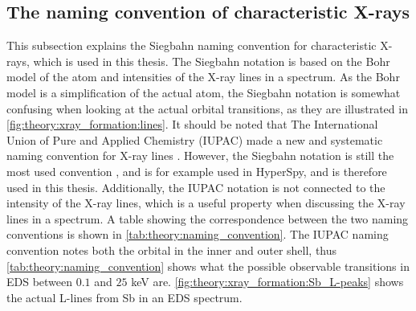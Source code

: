 \subsection{The naming convention of characteristic X-rays}
\label{theory:xray_formation:naming}

This subsection explains the Siegbahn naming convention for characteristic X-rays, which is used in this thesis.
The Siegbahn notation is based on the Bohr model of the atom and intensities of the X-ray lines in a spectrum.
As the Bohr model is a simplification of the actual atom, the Siegbahn notation is somewhat confusing when looking at the actual orbital transitions, as they are illustrated in \cref{fig:theory:xray_formation:lines}.
It should be noted that The International Union of Pure and Applied Chemistry (IUPAC) made a new and systematic naming convention for X-ray lines \cite{IUPAC_nomenclature1991}.
However, the Siegbahn notation is still the most used convention \cite[Ch. 4.2.4]{goldstein_scanning_2018}, and is for example used in HyperSpy, and is therefore used in this thesis.
Additionally, the IUPAC notation is not connected to the intensity of the X-ray lines, which is a useful property when discussing the X-ray lines in a spectrum.
A table showing the correspondence between the two naming conventions is shown in \cref{tab:theory:naming_convention}.
The IUPAC naming convention notes both the orbital in the inner and outer shell, thus \cref{tab:theory:naming_convention} shows what the possible observable transitions in EDS between $0.1$ and $25$ keV are.
\cref{fig:theory:xray_formation:Sb_L-peaks} shows the actual L-lines from Sb in an EDS spectrum.



